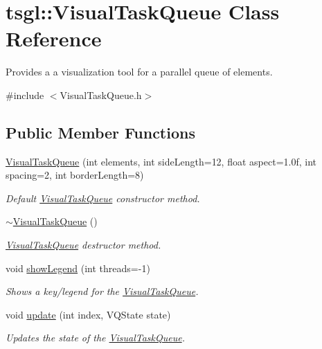 \hypertarget{classtsgl_1_1_visual_task_queue}{\section{tsgl\-:\-:Visual\-Task\-Queue Class Reference}
\label{classtsgl_1_1_visual_task_queue}
}


Provides a a visualization tool for a parallel queue of elements.  




{\ttfamily \#include $<$Visual\-Task\-Queue.\-h$>$}

\subsection*{Public Member Functions}
\begin{DoxyCompactItemize}
\item 
\hyperlink{classtsgl_1_1_visual_task_queue_ad82aabf35ec367b2b0c5894999f5e76e}{Visual\-Task\-Queue} (int elements, int side\-Length=12, float aspect=1.\-0f, int spacing=2, int border\-Length=8)
\begin{DoxyCompactList}\small\item\em Default \hyperlink{classtsgl_1_1_visual_task_queue}{Visual\-Task\-Queue} constructor method. \end{DoxyCompactList}\item 
\hyperlink{classtsgl_1_1_visual_task_queue_ae961a57508ba1d38570d1431c4367a09}{$\sim$\-Visual\-Task\-Queue} ()
\begin{DoxyCompactList}\small\item\em \hyperlink{classtsgl_1_1_visual_task_queue}{Visual\-Task\-Queue} destructor method. \end{DoxyCompactList}\item 
void \hyperlink{classtsgl_1_1_visual_task_queue_a7153e63b78fc257f162410c3e55e13dc}{show\-Legend} (int threads=-\/1)
\begin{DoxyCompactList}\small\item\em Shows a key/legend for the \hyperlink{classtsgl_1_1_visual_task_queue}{Visual\-Task\-Queue}. \end{DoxyCompactList}\item 
void \hyperlink{classtsgl_1_1_visual_task_queue_a2fc5733a57213a6eee116408738851fc}{update} (int index, V\-Q\-State state)
\begin{DoxyCompactList}\small\item\em Updates the state of the \hyperlink{classtsgl_1_1_visual_task_queue}{Visual\-Task\-Queue}. \end{DoxyCompactList}\item 

\end{DoxyCompactItemize}
